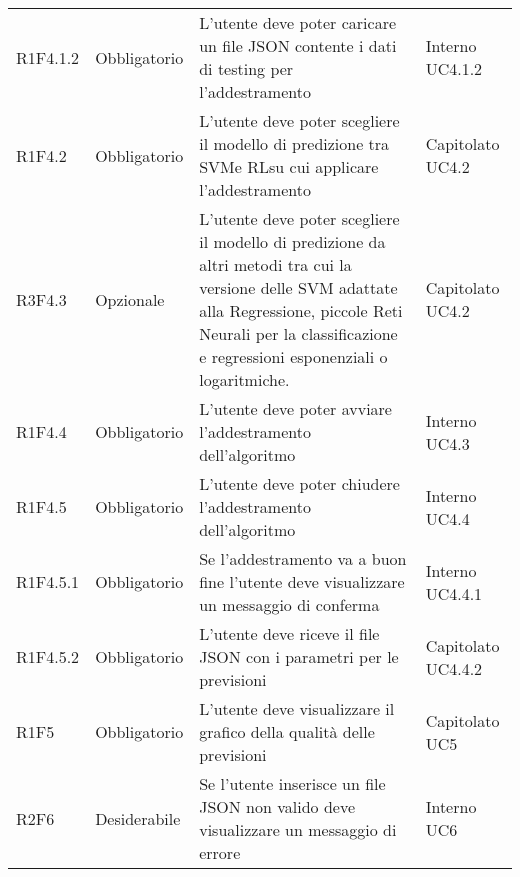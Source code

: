 \begin{longtable} {
		>{}p{24mm} 
		>{}p{32mm}
		>{}p{40mm} 
		>{}p{24.5mm}
		}
		R1F4.1.2 & Obbligatorio & L'utente deve poter caricare un file JSON contente i dati di testing per l'addestramento & Interno UC4.1.2 \TBstrut \\ [2mm]		
		R1F4.2 & Obbligatorio & L'utente deve poter scegliere il modello di predizione tra SVM\glosp e RL\glosp su cui applicare l'addestramento & Capitolato UC4.2 \TBstrut \\ [2mm]
		R3F4.3 & Opzionale & L'utente deve poter scegliere il modello di predizione da altri metodi tra cui la versione delle SVM adattate alla Regressione, piccole Reti Neurali per la classificazione e regressioni esponenziali o logaritmiche. & Capitolato UC4.2 \TBstrut \\ [2mm]				
		R1F4.4 & Obbligatorio & L'utente deve poter avviare l'addestramento dell'algoritmo & Interno UC4.3 \TBstrut \\ [2mm]
		R1F4.5 & Obbligatorio & L'utente deve poter chiudere l'addestramento dell'algoritmo & Interno UC4.4 \TBstrut \\ [2mm]		
		R1F4.5.1 & Obbligatorio & Se l'addestramento va a buon fine l'utente deve visualizzare un messaggio di conferma & Interno UC4.4.1 \TBstrut \\ [2mm]		
		R1F4.5.2 & Obbligatorio & L'utente deve riceve il file JSON con i parametri per le previsioni & Capitolato UC4.4.2 \TBstrut \\ [2mm]
		R1F5 & Obbligatorio & L'utente deve visualizzare il grafico della qualità delle previsioni & Capitolato UC5 \TBstrut \\ [2mm]
		R2F6 & Desiderabile & Se l'utente inserisce un file JSON non valido deve visualizzare un messaggio di errore & Interno UC6 \TBstrut \\ [2mm]
	\end{longtable}